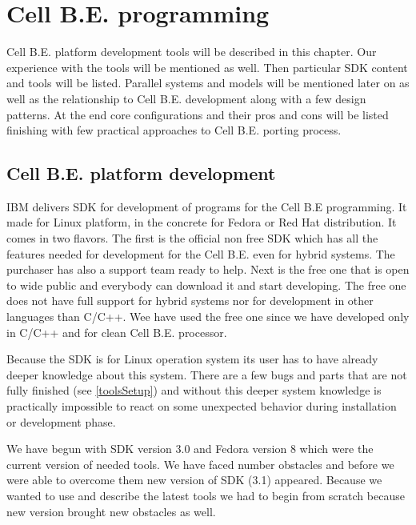 \chapter {Cell B.E. programming}
\par
Cell B.E. platform development tools will be described in this chapter.
Our experience with the tools will be mentioned as well.
Then particular SDK content and tools will be listed.
Parallel systems and models will be mentioned later on as well as the relationship to Cell B.E. development along with a few design patterns.
At the end core configurations and their pros and cons will be listed finishing with few practical approaches to Cell B.E. porting process.

\section{Cell B.E. platform development}
\par
IBM delivers SDK for development of programs for the Cell B.E programming.
It made for Linux platform, in the concrete for Fedora or Red Hat distribution.
It comes in two flavors.
The first is the official non free SDK which has all the features needed for development for the Cell B.E. even for hybrid systems.
The purchaser has also a support team ready to help.
Next is the free one that is open to wide public and everybody can download it and start developing.
The free one does not have full support for hybrid systems nor for development in other languages than C/C++.
Wee have used the free one since we have developed only in C/C++ and for clean Cell B.E. processor.

\par
Because the SDK is for Linux operation system its user has to have already deeper knowledge about this system.
There are a few bugs and parts that are not fully finished (see \ref{toolsSetup}) and without this deeper system knowledge is practically impossible to react on some unexpected behavior during installation or development phase.

\par
We have begun with SDK version 3.0 and Fedora version 8 which were the current version of needed tools.
We have faced number obstacles and before we were able to overcome them new version of SDK (3.1) appeared.
Because we wanted to use and describe the latest tools we had to begin from scratch because new version brought new obstacles as well.

